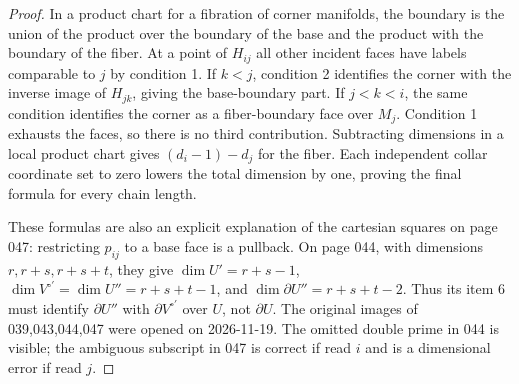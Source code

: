 \begin{proof}
In a product chart for a fibration of corner manifolds, the boundary
is the union of the product over the boundary of the base and the
product with the boundary of the fiber. At a point of $H_{ij}$ all
other incident faces have labels comparable to $j$ by condition 1.
If $k<j$, condition 2 identifies the corner with the inverse image
of $H_{jk}$, giving the base-boundary part. If $j<k<i$, the same
condition identifies the corner as a fiber-boundary face over $M_j$.
Condition 1 exhausts the faces, so there is no third contribution.
Subtracting dimensions in a local product chart gives
$(d_i-1)-d_j$ for the fiber. Each independent collar coordinate
set to zero lowers the total dimension by one, proving the final
formula for every chain length.

These formulas are also an explicit explanation of the cartesian
squares on page 047: restricting $p_{ij}$ to a base face is a
pullback. On page 044, with dimensions $r,r+s,r+s+t$, they give
$\dim U'=r+s-1$, $\dim V^{\circ\prime}=\dim U''=r+s+t-1$,
and $\dim\partial U''=r+s+t-2$.
Thus its item 6 must identify $\partial U''$ with
$\partial V^{\circ\prime}$ over $U$, not $\partial U$.
The original images of 039,043,044,047 were opened on 2026-11-19.
The omitted double prime in 044 is visible; the ambiguous subscript
in 047 is correct if read $i$ and is a dimensional error if read $j$.
\end{proof}

